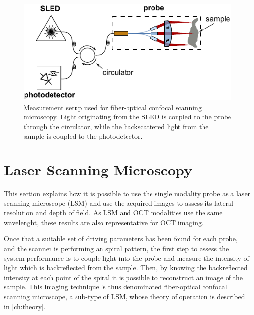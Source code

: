 \begin{figure}[h!]\centering \includegraphics[width=12cm]{figures/50_Measurements/conf/setup/confSetup.pdf}
      \caption{Measurement setup used for fiber-optical confocal scanning microscopy. Light originating from the SLED is coupled to the probe through the circulator, while the backscattered light from the sample is coupled to the photodetector.}
      \label{fig:confSetup}
\end{figure}

\section{Laser Scanning Microscopy}
This section explains how it is possible to use the single modality probe as a laser scanning microscope (LSM) and use the acquired images to assess its lateral resolution and depth of field. As LSM and OCT modalities use the same wavelenght, these results are also representative for OCT imaging.

Once that a suitable set of driving parameters has been found for each probe, and the scanner is performing an spiral pattern, the first step to assess the system performance is to couple light into the probe and measure the intensity of light which is backreflected from the sample. Then, by knowing the backreflected intensity at each point of the spiral it is possible to reconstruct an image of the sample. This imaging technique is thus denominated fiber-optical confocal scanning microscope, a sub-type of LSM, whose theory of operation is described in \autoref{ch:theory}.


